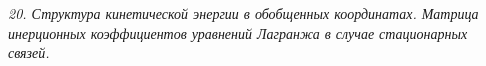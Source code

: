 \emph{20. Структура кинетической энергии в обобщенных координатах. Матрица
инерционных коэффициентов уравнений Лагранжа в случае стационарных связей.}

\newpage
